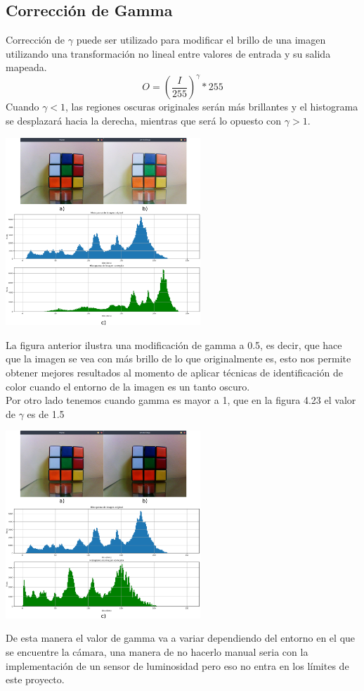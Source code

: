 \subsection{Corrección de Gamma}
Corrección de $\gamma$ puede ser utilizado para modificar el brillo de una imagen utilizando una transformación no lineal entre
valores de entrada y su salida mapeada.
\begin{equation}
	O = \left( \frac{I}{255} \right)^\gamma * 255
\end{equation}
Cuando $\gamma <1$, las regiones oscuras originales serán más brillantes y el histograma se desplazará hacia la derecha, mientras que será
lo opuesto con $\gamma> 1$.
\begin{center}
	\includegraphics[width=0.55\textwidth]{Contenido/Cuerpo/Capitulo4/Fig23.eps}
	\label{Fig9}
\end{center}
La figura anterior ilustra una modificación de gamma a 0.5, es decir, que hace que la imagen se vea con más brillo de lo que originalmente
es, esto nos permite obtener mejores resultados al momento de aplicar técnicas de identificación de color cuando el entorno de la imagen
es un tanto oscuro.\\
Por otro lado tenemos cuando gamma es mayor a 1, que en la figura 4.23 el valor de $\gamma$ es de 1.5
\begin{center}
	\includegraphics[width=0.55\textwidth]{Contenido/Cuerpo/Capitulo4/Fig24.eps}
	\label{Fig9}
\end{center}
De esta manera el valor de gamma va a variar dependiendo del entorno en el que se encuentre la cámara, una manera de no hacerlo
manual seria con la implementación de un sensor de luminosidad pero eso no entra en los límites de este proyecto.


